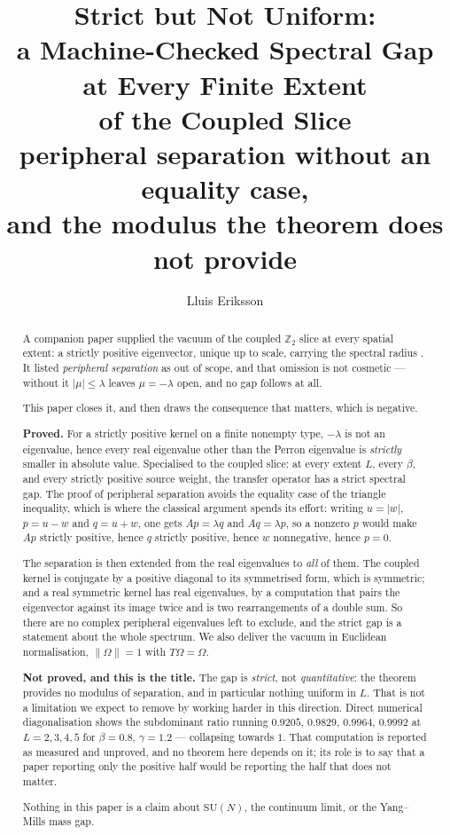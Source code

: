 \documentclass[11pt]{article}
\title{Strict but Not Uniform:\\
a Machine-Checked Spectral Gap at Every Finite Extent\\
of the Coupled Slice\\
\large peripheral separation without an equality case,\\
and the modulus the theorem does not provide}
\author{Lluis Eriksson}
\date{}
\theoremstyle{definition}
\newcommand{\Z}{\mathbb{Z}}
\newcommand{\SU}{\mathrm{SU}}
\newcommand{\Om}{\Omega}
\begin{document}
\maketitle

\begin{abstract}
A companion paper supplied the vacuum of the coupled $\Z_2$ slice at every
spatial extent: a strictly positive eigenvector, unique up to scale, carrying
the spectral radius \cite{ErikssonPerron}.  It listed \emph{peripheral
separation} as out of scope, and that omission is not cosmetic --- without it
$|\mu|\le\lambda$ leaves $\mu=-\lambda$ open, and no gap follows at all.

This paper closes it, and then draws the consequence that matters, which is
negative.

\textbf{Proved.}  For a strictly positive kernel on a finite nonempty type,
$-\lambda$ is not an eigenvalue, hence every real eigenvalue other than the
Perron eigenvalue is \emph{strictly} smaller in absolute value.  Specialised to
the coupled slice: at every extent $L$, every $\beta$, and every strictly
positive source weight, the transfer operator has a strict spectral gap.  The
proof of peripheral separation avoids the equality case of the triangle
inequality, which is where the classical argument spends its effort: writing
$u=|w|$, $p=u-w$ and $q=u+w$, one gets $Ap=\lambda q$ and $Aq=\lambda p$, so a
nonzero $p$ would make $Ap$ strictly positive, hence $q$ strictly positive,
hence $w$ nonnegative, hence $p=0$.

The separation is then extended from the real eigenvalues to \emph{all} of them.
The coupled kernel is conjugate by a positive diagonal to its symmetrised form,
which is symmetric; and a real symmetric kernel has real eigenvalues, by a
computation that pairs the eigenvector against its image twice and is two
rearrangements of a double sum.  So there are no complex peripheral eigenvalues
left to exclude, and the strict gap is a statement about the whole spectrum.  We
also deliver the vacuum in Euclidean normalisation, $\|\Om\|=1$ with
$T\Om=\Om$.

\textbf{Not proved, and this is the title.}  The gap is \emph{strict}, not
\emph{quantitative}: the theorem provides no modulus of separation, and in
particular nothing uniform in $L$.  That is not a limitation we expect to remove
by working harder in this direction.  Direct numerical diagonalisation shows the
subdominant ratio running $0.9205,\,0.9829,\,0.9964,\,0.9992$ at $L=2,3,4,5$ for
$\beta=0.8$, $\gamma=1.2$ --- collapsing towards $1$.  That computation is
reported as measured and unproved, and no theorem here depends on it; its role
is to say that a paper reporting only the positive half would be reporting the
half that does not matter.

Nothing in this paper is a claim about $\SU(N)$, the continuum limit, or the
Yang--Mills mass gap.
\end{abstract}
\end{document}

